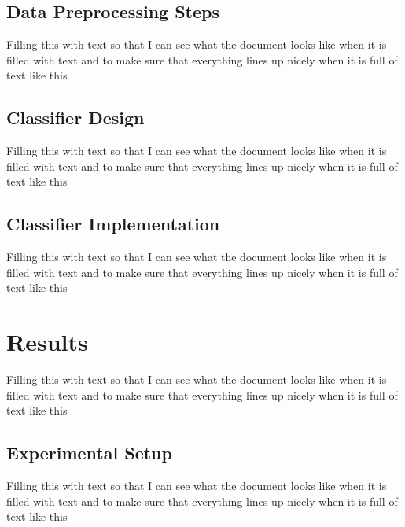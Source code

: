 \documentclass[11pt]{article}       %
\begin{document}
\subsection{Data Preprocessing Steps} \label{preprocessing}
Filling this with text so that I can see what the document looks like when it is filled with text and to make sure that everything lines up nicely when it is full of text like this

\subsection{Classifier Design} \label{design}
Filling this with text so that I can see what the document looks like when it is filled with text and to make sure that everything lines up nicely when it is full of text like this

\subsection{Classifier Implementation} \label{implementation}
Filling this with text so that I can see what the document looks like when it is filled with text and to make sure that everything lines up nicely when it is full of text like this

\section{Results} \label{results}
Filling this with text so that I can see what the document looks like when it is filled with text and to make sure that everything lines up nicely when it is full of text like this

\subsection{Experimental Setup} \label{experiment}
Filling this with text so that I can see what the document looks like when it is filled with text and to make sure that everything lines up nicely when it is full of text like this
\end{document}
